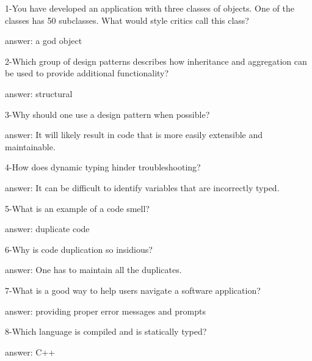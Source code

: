 1-You have developed an application with three classes of objects. One of the classes has 50 subclasses. What would style critics call this class?

answer: a god object

2-Which group of design patterns describes how inheritance and aggregation can be used to provide additional functionality?

answer: structural

3-Why should one use a design pattern when possible?

answer: It will likely result in code that is more easily extensible and maintainable.

4-How does dynamic typing hinder troubleshooting?

answer: It can be difficult to identify variables that are incorrectly typed.

5-What is an example of a code smell?

answer: duplicate code

6-Why is code duplication so insidious?

answer: One has to maintain all the duplicates.

7-What is a good way to help users navigate a software application?

answer: providing proper error messages and prompts

8-Which language is compiled and is statically typed?

answer: C++

